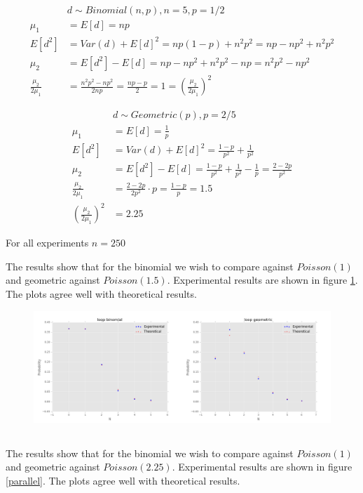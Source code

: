 \documentclass{article}
\begin{document}
\subsection{}
$$
\begin{aligned}
&d\sim Binomial(n,p),n=5,p=1/2\\
\mu_1&=E[d]=np\\
E[d^2]&=Var(d)+E[d]^2=np(1-p)+n^2p^2=np-np^2+n^2p^2\\
\mu_2&=E[d^2]-E[d]=np-np^2+n^2p^2-np=n^2p^2-np^2\\
\frac{\mu_2}{2\mu_1}&=\frac{n^2p^2-np^2}{2np}=\frac{np-p}{2}=1=(\frac{\mu_2}{2\mu_1})^2
\end{aligned}
$$

$$
\begin{aligned}
&d\sim Geometric(p),p=2/5\\
\mu_1&=E[d]=\frac{1}{p}\\
E[d^2]&=Var(d)+E[d]^2=\frac{1-p}{p^2}+\frac{1}{p^2}\\
\mu_2&=E[d^2]-E[d]=\frac{1-p}{p^2}+\frac{1}{p^2}-\frac{1}{p}=\frac{2-2p}{p^2}\\
\frac{\mu_2}{2\mu_1}&=\frac{2-2p}{2p^2}\cdot p=\frac{1-p}{p}=1.5\\
(\frac{\mu_2}{2\mu_1})^2&=2.25
\end{aligned}
$$

For all experiments $n=250$

The results show that for the binomial we wish to compare against $Poisson(1)$ and geometric against $Poisson(1.5)$. Experimental results are shown in figure \ref{loop}. The plots agree well with theoretical results.

\begin{figure}[!ht]
	\centering
	\includegraphics[width=\textwidth]{loop.png}
	\label{loop}
\end{figure}

\subsection{}
\vspace{-2ex}
The results show that for the binomial we wish to compare against $Poisson(1)$ and geometric against $Poisson(2.25)$. Experimental results are shown in figure \ref{parallel}. The plots agree well with theoretical results.
\end{document}
